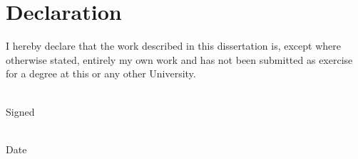 \clearpage
\pagestyle{empty} 
\section*{Declaration}

I hereby declare that the work described in this dissertation is, except
where otherwise stated, entirely my own work and has not been submitted as 
exercise for a degree at this or any other University.

\vspace{3cm}

\noindent
\begin{minipage}[t]{0.45\textwidth}
    
    \centering
     \\[-4.5ex]
    Signed \dotfill \\
    
\end{minipage}
\hfill
\begin{minipage}[t]{0.45\textwidth}
    \centering
     \\[-4.5ex]
    Date \dotfill 
\end{minipage}
